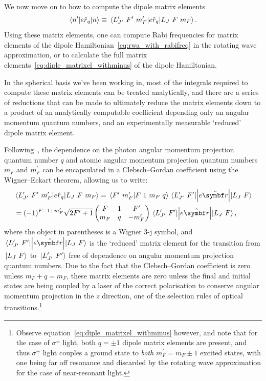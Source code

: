 We now move on to how to compute the dipole matrix elements
\begin{align}
\matrixel{n^\prime}{e\hat r_q}{n} \equiv \matrixel{L^\prime_{J^\prime}\ F^\prime\ m_F^\prime}{e\hat r_q}{L_J\ F\ m_F}.
\end{align}
Using these matrix elements, one can compute Rabi frequencies for matrix elements of the dipole Hamiltonian~\eqref{eq:rwa_with_rabifreq} in the rotating wave approximation, or to calculate the full matrix elements~\eqref{eq:diple_matrixel_withminus} of the dipole Hamiltonian.

In the spherical basis we've been working in, most of the integrals required to compute these matrix elements can be treated analytically, and there are a series of reductions that can be made to ultimately reduce the matrix elements down to a product of an analytically computable coefficient depending only an angular momentum quantum numbers, and an experimentally measurable `reduced' dipole matrix element.

Following~\cite{steck_rubidium_2015}, the dependence on the photon angular momentum projection quantum number $q$ and atomic angular momentum projection quantum numbers $m_F$ and $m_F^\prime$ can be encapsulated in a Clebsch--Gordan coefficient using the Wigner--Eckart theorem, allowing us to write:
\begin{align}
& \matrixel{L^\prime_{J^\prime}\ F^\prime\ m_F^\prime}{e\hat r_q}{L_J\ F\ m_F} = 
\braket{F^\prime\ m_F^\prime}{F\ 1\ m_F\ q}
\matrixel{L^\prime_{J^\prime}\ F^\prime}{\left|e\hat{\vec r}\right|}{L_J\ F}\\
&=
(-1)^{F - 1 + m_F^\prime}\sqrt{2F^\prime + 1}
\left(\begin{matrix}
F & 1 & F^\prime\\
m_F & q & -m_F^\prime\\
\end{matrix}\right)
\matrixel{L^\prime_{J^\prime}\ F^\prime}{\left|e\hat{\vec r}\right|}{L_J\ F},
\end{align}
where the object in parentheses is a Wigner $3$-j symbol, and $\matrixel{L^\prime_{J^\prime}\ F^\prime}{\left|e\hat{\vec r}\right|}{L_J\ F}$ is the `reduced' matrix element for the transition from $\ket{L_J\ F}$ to $\ket{L^\prime_{J^\prime}\ F^\prime}$ free of dependence on angular momentum projection quantum numbers. Due to the fact that the Clebsch--Gordan coefficient is zero unless $m_F + q = m_F$, these matrix elements are zero unless the final and initial states are being coupled by a laser of the correct polarisation to conserve angular momentum projection in the $z$ direction, one of the selection rules of optical transitions.\footnote{Observe equation~\eqref{eq:diple_matrixel_withminus} however, and note that for the case of $\sigma^\pm$ light, both $q=\pm 1$ dipole matrix elements are present, and thus $\sigma^\pm$ light couples a ground state to \emph{both} $m_F^\prime = m_F \pm 1$ excited states, with one being far off resonance and discarded by the rotating wave approximation for the case of near-resonant light.}

